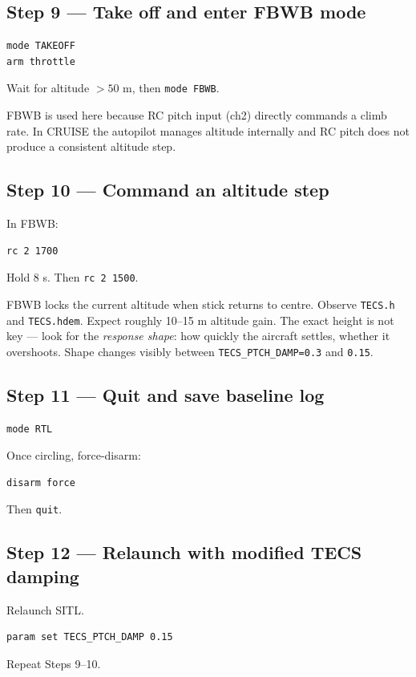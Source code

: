 \documentclass[a4paper,11pt,twoside]{article}
\begin{document}
\subsection*{Step 9 --- Take off and enter FBWB mode}
\begin{Verbatim}[frame=single,fontsize=\small]
mode TAKEOFF
arm throttle
\end{Verbatim}
Wait for altitude $> 50$ m, then \texttt{mode FBWB}.

FBWB is used here because RC pitch input (ch2) directly commands a climb rate. In CRUISE the autopilot manages altitude internally and RC pitch does not produce a consistent altitude step.

\subsection*{Step 10 --- Command an altitude step}
In FBWB:
\begin{Verbatim}[frame=single,fontsize=\small]
rc 2 1700
\end{Verbatim}
Hold 8 s. Then \texttt{rc 2 1500}.

FBWB locks the current altitude when stick returns to centre. Observe \texttt{TECS.h} and \texttt{TECS.hdem}. Expect roughly 10--15 m altitude gain. The exact height is not key --- look for the \emph{response shape}: how quickly the aircraft settles, whether it overshoots. Shape changes visibly between \texttt{TECS\_PTCH\_DAMP=0.3} and \texttt{0.15}.

\subsection*{Step 11 --- Quit and save baseline log}
\begin{Verbatim}[frame=single,fontsize=\small]
mode RTL
\end{Verbatim}
Once circling, force-disarm:
\begin{Verbatim}[frame=single,fontsize=\small]
disarm force
\end{Verbatim}
Then \texttt{quit}.

\subsection*{Step 12 --- Relaunch with modified TECS damping}
Relaunch SITL.
\begin{Verbatim}[frame=single,fontsize=\small]
param set TECS_PTCH_DAMP 0.15
\end{Verbatim}
Repeat Steps 9--10.
\end{document}
